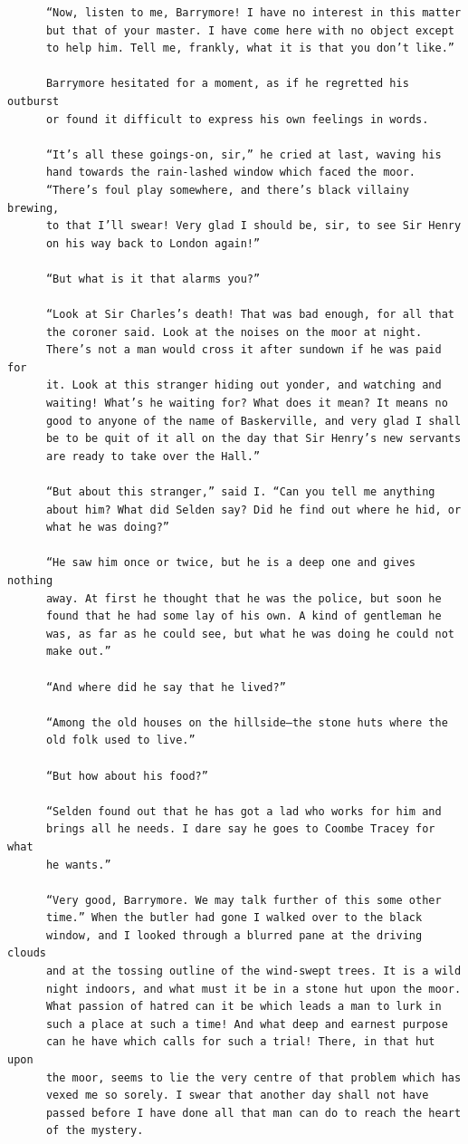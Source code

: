 \documentclass{article}
\begin{document}
\begin{verbatim}
      “Now, listen to me, Barrymore! I have no interest in this matter
      but that of your master. I have come here with no object except
      to help him. Tell me, frankly, what it is that you don’t like.”

      Barrymore hesitated for a moment, as if he regretted his outburst
      or found it difficult to express his own feelings in words.

      “It’s all these goings-on, sir,” he cried at last, waving his
      hand towards the rain-lashed window which faced the moor.
      “There’s foul play somewhere, and there’s black villainy brewing,
      to that I’ll swear! Very glad I should be, sir, to see Sir Henry
      on his way back to London again!”

      “But what is it that alarms you?”

      “Look at Sir Charles’s death! That was bad enough, for all that
      the coroner said. Look at the noises on the moor at night.
      There’s not a man would cross it after sundown if he was paid for
      it. Look at this stranger hiding out yonder, and watching and
      waiting! What’s he waiting for? What does it mean? It means no
      good to anyone of the name of Baskerville, and very glad I shall
      be to be quit of it all on the day that Sir Henry’s new servants
      are ready to take over the Hall.”

      “But about this stranger,” said I. “Can you tell me anything
      about him? What did Selden say? Did he find out where he hid, or
      what he was doing?”

      “He saw him once or twice, but he is a deep one and gives nothing
      away. At first he thought that he was the police, but soon he
      found that he had some lay of his own. A kind of gentleman he
      was, as far as he could see, but what he was doing he could not
      make out.”

      “And where did he say that he lived?”

      “Among the old houses on the hillside—the stone huts where the
      old folk used to live.”

      “But how about his food?”

      “Selden found out that he has got a lad who works for him and
      brings all he needs. I dare say he goes to Coombe Tracey for what
      he wants.”

      “Very good, Barrymore. We may talk further of this some other
      time.” When the butler had gone I walked over to the black
      window, and I looked through a blurred pane at the driving clouds
      and at the tossing outline of the wind-swept trees. It is a wild
      night indoors, and what must it be in a stone hut upon the moor.
      What passion of hatred can it be which leads a man to lurk in
      such a place at such a time! And what deep and earnest purpose
      can he have which calls for such a trial! There, in that hut upon
      the moor, seems to lie the very centre of that problem which has
      vexed me so sorely. I swear that another day shall not have
      passed before I have done all that man can do to reach the heart
      of the mystery.





\end{verbatim}
\end{document}
